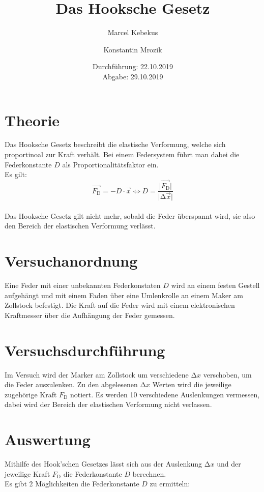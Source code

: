 \documentclass[titlepage = firstcover]{scrartcl}
\title{Das Hooksche Gesetz}
\author{Marcel Kebekus \and Konstantin Mrozik}
\date{%
  Durchführung: 22.10.2019 \\
  Abgabe: 29.10.2019
  }
\begin{document}
\maketitle
\thispagestyle{empty}
\tableofcontents
\clearpage
\setcounter{page}{1}

\newpage

\section{Theorie}
\label{sec:Theorie}
Das Hooksche Gesetz beschreibt die elastische Verformung, welche sich
proportinoal zur Kraft verhält.
Bei einem Federsystem führt man dabei die Federkonstante $D$ als Proportionalitätsfaktor ein.\\
Es gilt:
\\
\begin{equation}
  \vec{F_{\text{D}}}=-D \cdot \vec{x} \iff D=\frac{\lvert\vec{F_{\text{D}}}\rvert}{\lvert\increment\vec{x}\rvert}
  \label{eqn:Formel}
\end{equation}
\\
Das Hooksche Gesetz gilt nicht mehr, sobald die Feder überspannt wird, sie also den Bereich der
elastischen Verformung verlässt.


\section{Versuchanordnung}
\label{sec:Versuchsanordnung}
Eine Feder mit einer unbekannten Federkonstaten $D$ wird an einem festen Gestell aufgehängt
und mit einem Faden über eine Umlenkrolle an einem Maker am Zollstock befestigt. 
Die Kraft auf die Feder wird mit einem elektronischen Kraftmesser über die Aufhängung der Feder gemessen.


\section{Versuchsdurchführung}
\label{sec:Versuchsdurchführung}
Im Versuch wird der Marker am Zollstock um verschiedene $\increment x$ verschoben, um die Feder
auszulenken.
Zu den abgelesenen $\increment x$ Werten wird die jeweilige zugehörige Kraft $F_{\text{D}}$ notiert.
Es werden 10 verschiedene Auslenkungen vermessen, dabei wird der Bereich der elastischen Verformung nicht verlassen.

\newpage

\section{Auswertung}
\label{sec:Auswertung}
Mithilfe des Hook'schen Gesetzes lässt sich aus der Auslenkung $\increment x$ und der jeweilige
Kraft $F_{\text{D}}$ die Federkonstante $D$ berechnen.\\
Es gibt 2 Möglichkeiten die Federkonstante $D$ zu ermitteln:
\end{document}
